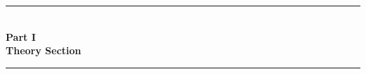 \documentclass[12pt,a4paper]{report}
\begin{document}
\vspace*{\fill}
\begin{center}
    {\color{borderblue}\rule{0.4\textwidth}{1pt}}\\[15pt]
    {\fontsize{42}{50}\selectfont\bfseries\color{chapterblue} Part I}\\[20pt]
    {\LARGE\bfseries\color{chapterblue} Theory Section}\\[15pt]
    {\color{borderblue}\rule{0.4\textwidth}{1pt}}
\end{center}
\vspace*{\fill}
\newpage

\tableofcontents
\newpage



\appendix

\end{document}
